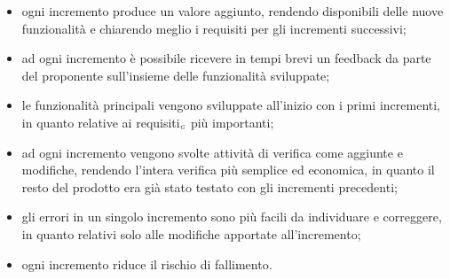\begin{itemize}
	\item ogni incremento produce un valore aggiunto, rendendo disponibili delle nuove funzionalità e chiarendo meglio i requisiti per gli incrementi successivi;
	\item ad ogni incremento è possibile ricevere in tempi brevi un feedback da parte del proponente sull'insieme delle funzionalità sviluppate;
	\item le funzionalità principali vengono sviluppate all'inizio con i primi incrementi, in quanto relative ai requisiti$_{\scaleto{G}{3pt}}$ più importanti;
	\item ad ogni incremento vengono svolte attività di verifica come aggiunte e modifiche, rendendo l'intera verifica più semplice ed economica, in quanto il resto del prodotto era già stato testato con gli incrementi precedenti;
	\item gli errori in un singolo incremento sono più facili da individuare e correggere, in quanto relativi solo alle modifiche apportate all'incremento;
	\item ogni incremento riduce il rischio di fallimento.
\end{itemize}